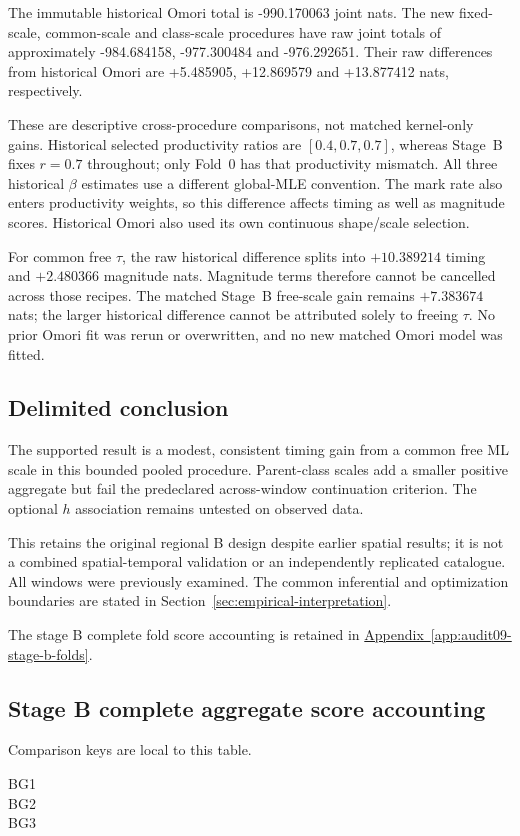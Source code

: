 The immutable historical Omori total is -990.170063 joint nats. The new fixed-scale, common-scale and class-scale procedures have raw joint totals of approximately -984.684158, -977.300484 and -976.292651. Their raw differences from historical Omori are +5.485905, +12.869579 and +13.877412 nats, respectively.

These are descriptive cross-procedure comparisons, not matched kernel-only gains. Historical selected productivity ratios are $[0.4,0.7,0.7]$, whereas Stage~B fixes $r=0.7$ throughout; only Fold~0 has that productivity mismatch. All three historical $\beta$ estimates use a different global-MLE convention. The mark rate also enters productivity weights, so this difference affects timing as well as magnitude scores. Historical Omori also used its own continuous shape/scale selection.

For common free $\tau$, the raw historical difference splits into $+10.389214$ timing and $+2.480366$ magnitude nats. Magnitude terms therefore cannot be cancelled across those recipes. The matched Stage~B free-scale gain remains $+7.383674$ nats; the larger historical difference cannot be attributed solely to freeing $\tau$. No prior Omori fit was rerun or overwritten, and no new matched Omori model was fitted.

\subsection{Delimited conclusion}


The supported result is a modest, consistent timing gain from a common free ML scale in this bounded pooled procedure. Parent-class scales add a smaller positive aggregate but fail the predeclared across-window continuation criterion. The optional $h$ association remains untested on observed data.

This retains the original regional B design despite earlier spatial results; it is not a combined spatial-temporal validation or an independently replicated catalogue. All windows were previously examined. The common inferential and optimization boundaries are stated in Section~\ref{sec:empirical-interpretation}.


\noindent The stage B complete fold score accounting is retained in \hyperref[app:audit09-stage-b-folds]{Appendix~\ref{app:audit09-stage-b-folds}}.

\subsection{Stage B complete aggregate score accounting}
Comparison keys are local to this table. 
\begin{description}
\item[BG1] 
\item[BG2] 
\item[BG3] 
\end{description}

